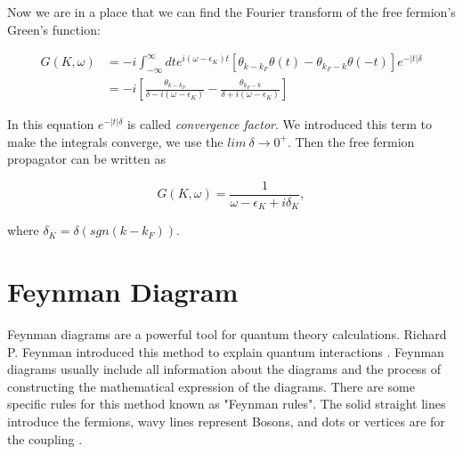 Now we are in a place that we can find the Fourier transform of the free fermion's Green's function:

\begin{equation}
\begin{split}
    G(K,\omega)&=-i\int_{-\infty}^{\infty} dt e^{i(\omega-\epsilon_K)t} [\theta_{k-k_F}\theta(t)-\theta_{k_F-k}\theta(-t)] e^{-|t|\delta}\\
    &=-i\left[\frac{\theta_{k-k_F}}{\delta-i(\omega-\epsilon_K)}-\frac{\theta_{k_F-k}}{\delta+i(\omega-\epsilon_K)}\right]
\end{split}
\end{equation}

In this equation $e^{-|t|\delta}$ is called \emph{convergence factor}. We introduced this term to make the integrals converge, we use the $lim \: \delta \rightarrow 0^+$. Then the free fermion propagator can be written as 

\begin{equation}
    G(K,\omega)=\frac{1}{\omega-\epsilon_K+i\delta_K},
\end{equation}

\noindent where $\delta_K= \delta (sgn(k-k_F))$.







\section{Feynman Diagram}

Feynman diagrams are a powerful tool for quantum theory calculations. Richard P. Feynman introduced this method to explain quantum interactions \cite{David, James, Kaiser}.  
Feynman diagrams usually include all information about the diagrams and the process of constructing the mathematical expression of the diagrams. There are some specific rules for this method known as "Feynman rules". The solid straight lines introduce the fermions, wavy lines represent Bosons, and dots or vertices are for the coupling \cite{James, Kaiser}.




